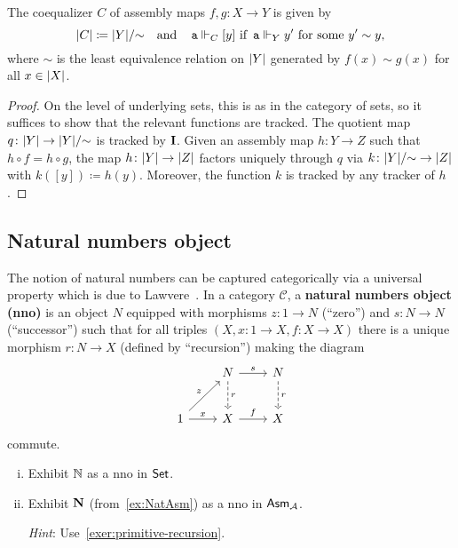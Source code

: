 \begin{proposition}[Coequalizers]
  The coequalizer \(C\) of assembly maps \(f,g \colon X \to Y\) is given by
  \[
    \lvert C\rvert \coloneq \lvert Y\rvert/{\sim}
    \quad\text{and}\quad
    \operatorname{\mathtt{a}} \Vdash_C [y] \text{ if } \operatorname{\mathtt{a}} \Vdash_Y y'
    \text{ for some } {y'} \sim y,
  \]
  where \({\sim}\) is the least equivalence relation on \(\lvert Y\rvert\)
  generated by \(f(x) \sim g(x)\) for all \(x \in \lvert X\rvert\).
\end{proposition}
\begin{proof}
  On the level of underlying sets, this is as in the category of sets, so it
  suffices to show that the relevant functions are tracked.
  The quotient map \(q \colon \lvert Y\rvert \to \lvert Y\rvert/{\sim}\) is tracked by
  \(\operatorname{\mathbf{I}}\).
  Given an assembly map \(h \colon Y \to Z\) such that
  \(h \circ f = h \circ g\), the map \(h \colon \lvert Y\rvert \to \lvert Z\rvert\)
  factors uniquely through \(q\) via
  \(k \colon \lvert Y\rvert/{\sim} \to \lvert Z\rvert\) with \(k([y]) \coloneq h(y)\).
  Moreover, the function \(k\) is tracked by any tracker of \(h\).
\end{proof}

\subsection{Natural numbers object}
The notion of natural numbers can be captured categorically via a universal
property which is due to Lawvere~\cite{Lawvere1963}. In a category
\(\mathcal C\), a \textbf{natural numbers object (nno)} is an object \(N\)
equipped with morphisms \(z \colon 1 \to N\) (``zero'') and \(s \colon N \to N\)
(``successor'') such that for all triples
\((X,x \colon 1 \to X,f\colon X \to X)\) there is a unique morphism
\(r \colon N \to X\) (defined by ``recursion'') making the diagram
\[
  \begin{tikzcd}[row sep=8mm,column sep=8mm]
    & N \ar[r,"s"] \ar[d,dashed,"r"] & N \ar[d,dashed,"r"] \\
    1 \ar[ur,"z"] \ar[r,"x"] & X \ar[r,"f"] & X
  \end{tikzcd}
\]
commute.

\begin{exercise}\label{exer:nno} \leavevmode
  \begin{enumerate}[(i)]
  \item Exhibit \(\mathbb N\) as a nno in \(\mathsf{Set}\).
  \item Exhibit \(\mathbf N\) (from~\cref{ex:NatAsm}) as a nno in \(\mathsf{Asm}_{\mathcal A}\).

    \emph{Hint}: Use~\cref{exer:primitive-recursion}.
  \end{enumerate}
\end{exercise}

